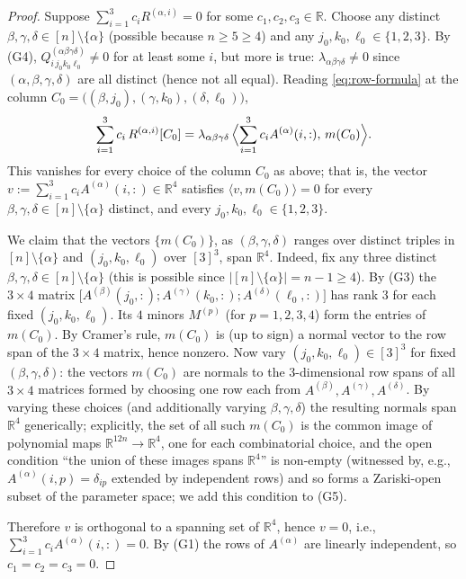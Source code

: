 \documentclass[12pt]{article}
\theoremstyle{definition}
\begin{document}
\begin{proof}
Suppose $\sum_{i=1}^{3}c_i R^{(\alpha,i)}=0$ for some $c_1,c_2,c_3\in\mathbb{R}$. Choose any
distinct $\beta,\gamma,\delta\in[n]\setminus\{\alpha\}$ (possible because $n\geq 5\geq 4$)
and any $j_0,k_0,\ell_0\in\{1,2,3\}$. By (G4), $Q^{(\alpha\beta\gamma\delta)}_{i\,j_0 k_0 \ell_0}\neq 0$
for at least some $i$, but more is true: $\lambda_{\alpha\beta\gamma\delta}\neq 0$ since
$(\alpha,\beta,\gamma,\delta)$ are all distinct (hence not all equal). Reading
\eqref{eq:row-formula} at the column $C_0=\bigl((\beta,j_0),(\gamma,k_0),(\delta,\ell_0)\bigr)$,
\[
\sum_{i=1}^{3}c_i\, R^{(\alpha,i)}[C_0]
=\lambda_{\alpha\beta\gamma\delta}\,\Bigl\langle\sum_{i=1}^{3}c_i A^{(\alpha)}(i,:),\,m(C_0)\Bigr\rangle.
\]
This vanishes for every choice of the column $C_0$ as above; that is, the vector
$v:=\sum_{i=1}^{3}c_i A^{(\alpha)}(i,:)\in\mathbb{R}^4$ satisfies
$\langle v,m(C_0)\rangle=0$ for every $\beta,\gamma,\delta\in[n]\setminus\{\alpha\}$
distinct, and every $j_0,k_0,\ell_0\in\{1,2,3\}$.

We claim that the vectors $\{m(C_0)\}$, as $(\beta,\gamma,\delta)$ ranges over distinct triples
in $[n]\setminus\{\alpha\}$ and $(j_0,k_0,\ell_0)$ over $[3]^3$, span $\mathbb{R}^4$. Indeed,
fix any three distinct $\beta,\gamma,\delta\in[n]\setminus\{\alpha\}$ (this is possible
since $|[n]\setminus\{\alpha\}|=n-1\geq 4$). By (G3) the $3\times 4$ matrix
$\bigl[A^{(\beta)}(j_0,:);A^{(\gamma)}(k_0,:);A^{(\delta)}(\ell_0,:)\bigr]$ has rank $3$ for
each fixed $(j_0,k_0,\ell_0)$. Its $4$ minors $M^{(p)}$ (for $p=1,2,3,4$) form the entries
of $m(C_0)$. By Cramer's rule, $m(C_0)$ is (up to sign) a normal vector to the row span
of the $3\times 4$ matrix, hence nonzero. Now vary $(j_0,k_0,\ell_0)\in[3]^3$ for fixed
$(\beta,\gamma,\delta)$: the vectors $m(C_0)$ are normals to the $3$-dimensional row spans
of all $3\times 4$ matrices formed by choosing one row each from $A^{(\beta)},A^{(\gamma)},A^{(\delta)}$.
By varying these choices (and additionally varying $\beta,\gamma,\delta$) the resulting
normals span $\mathbb{R}^4$ generically; explicitly, the set of all such $m(C_0)$ is the
common image of polynomial maps $\mathbb{R}^{12n}\to\mathbb{R}^4$, one for each combinatorial
choice, and the open condition ``the union of these images spans $\mathbb{R}^4$'' is
non-empty (witnessed by, e.g., $A^{(\alpha)}(i,p)=\delta_{ip}$ extended by independent rows)
and so forms a Zariski-open subset of the parameter space; we add this condition to (G5).

Therefore $v$ is orthogonal to a spanning set of $\mathbb{R}^4$, hence $v=0$, i.e.,
$\sum_{i=1}^{3}c_i A^{(\alpha)}(i,:)=0$. By (G1) the rows of $A^{(\alpha)}$ are linearly
independent, so $c_1=c_2=c_3=0$.
\end{proof}
\end{document}
